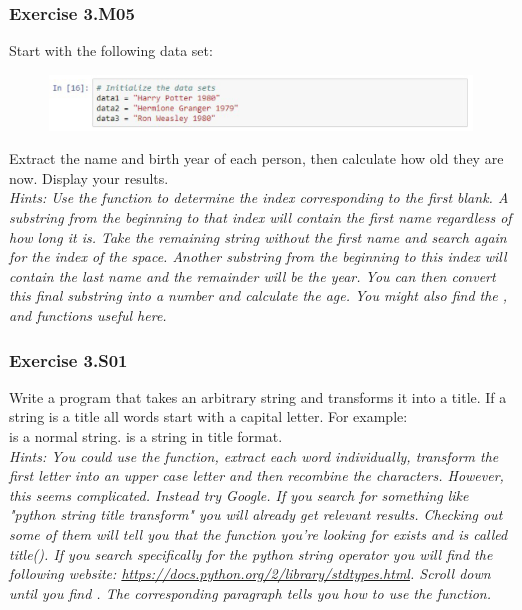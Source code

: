 
\subsubsection*{Exercise 3.M05}
Start with the following data set:
\begin{figure}[H]
		\centering
		\includegraphics[width=\textwidth]{../IMG/3M06.png} 
\end{figure}
Extract the name and birth year of each person, then calculate how old they are now.
Display your results.\\


\textit{Hints:
Use the {} function to determine the index corresponding to the first blank. A substring from the beginning to that index will contain the first name regardless of how long it is. Take the remaining string without the first name and search again for the index of the space.
Another substring from the beginning to this index will contain the last name and the
remainder will be the year. You can then convert this final substring into a number and
calculate the age. You might also find the {}, {} and {} functions useful here.}\\[1cm]




\subsubsection*{Exercise 3.S01}
Write a program that takes an arbitrary string and transforms it into a title. If a string is a
title all words start with a capital letter. For example:\\
{} is a normal string.
{} is a string in title format.\\


\textit{Hints:
You could use the {} function, extract each word individually, transform the first letter into an upper case letter and then recombine the characters. However, this seems
complicated. Instead try Google. If you search for something like "python string title
transform" you will already get relevant results. Checking out some of them will tell you that
the function you’re looking for exists and is called title(). If you search specifically for the
python string operator {} you will find the following website:
\url{https://docs.python.org/2/library/stdtypes.html}. Scroll down until you find {}. The corresponding paragraph tells you how to use the function.}\\[1cm]



